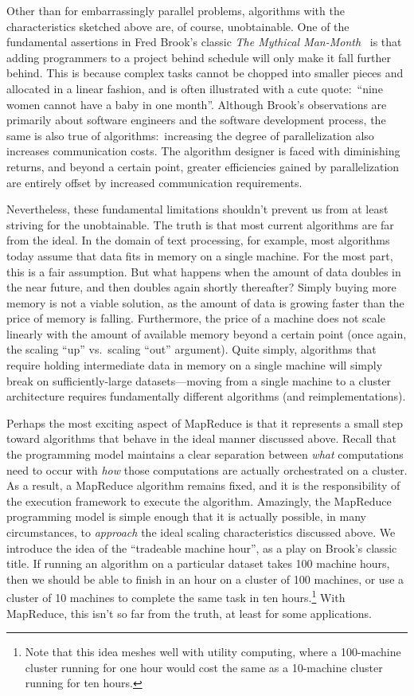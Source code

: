 Other than for embarrassingly parallel problems, algorithms with the
characteristics sketched above are, of course, unobtainable.  One of
the fundamental assertions in Fred Brook's classic \emph{The Mythical
  Man-Month}~\cite{Brooks_1995} is that adding programmers to a
project behind schedule will only make it fall further behind.  This
is because complex tasks cannot be chopped into smaller pieces and
allocated in a linear fashion, and is often illustrated with a cute
quote:\ ``nine women cannot have a baby in one month''.  Although
Brook's observations are primarily about software engineers and the
software development process, the same is also true of
algorithms:\ increasing the degree of parallelization also increases
communication costs.  The algorithm designer is faced with diminishing
returns, and beyond a certain point, greater efficiencies gained by
parallelization are entirely offset by increased communication
requirements.

Nevertheless, these fundamental limitations shouldn't prevent us from
at least striving for the unobtainable.  The truth is that most
current algorithms are far from the ideal.  In the domain of text
processing, for example, most algorithms today assume that data fits
in memory on a single machine.  For the most part, this is a fair
assumption.  But what happens when the amount of data doubles in the
near future, and then doubles again shortly thereafter?  Simply buying
more memory is not a viable solution, as the amount of data is growing
faster than the price of memory is falling.  Furthermore, the price of
a machine does not scale linearly with the amount of available memory
beyond a certain point (once again, the scaling ``up'' vs.\ scaling
``out'' argument).  Quite simply, algorithms that require holding
intermediate data in memory on a single machine will simply break on
sufficiently-large datasets---moving from a single machine to a
cluster architecture requires fundamentally different algorithms (and
reimplementations).

Perhaps the most exciting aspect of MapReduce is that it represents a
small step toward algorithms that behave in the ideal manner discussed
above.  Recall that the programming model maintains a clear separation
between \emph{what} computations need to occur with \emph{how} those
computations are actually orchestrated on a cluster.  As a result, a
MapReduce algorithm remains fixed, and it is the responsibility of the
execution framework to execute the algorithm.  Amazingly, the
MapReduce programming model is simple enough that it is actually
possible, in many circumstances, to \emph{approach} the ideal scaling
characteristics discussed above.  We introduce the idea of the
``tradeable machine hour'', as a play on Brook's classic title.  If
running an algorithm on a particular dataset takes 100 machine hours,
then we should be able to finish in an hour on a cluster of 100
machines, or use a cluster of 10 machines to complete the same task in
ten hours.\footnote{Note that this idea meshes well with utility
  computing, where a 100-machine cluster running for one hour would
  cost the same as a 10-machine cluster running for ten hours.} With
MapReduce, this isn't so far from the truth, at least for some
applications.

